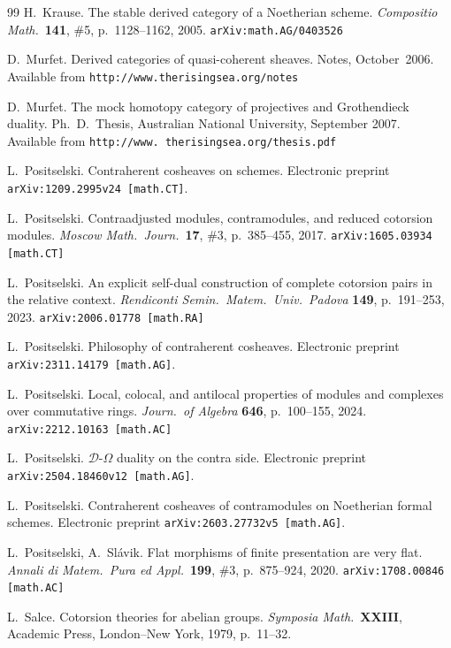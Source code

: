 \documentclass[12pt,a4paper]{amsart}
\newcommand{\+}{\nobreakdash-}
\renewcommand{\:}{\colon}
\theoremstyle{plain}
\theoremstyle{definition}
\begin{document}
\begin{thebibliography}{99}
 H.~Krause.
   The stable derived category of a Noetherian scheme.
\textit{Compositio Math.}\ \textbf{141}, \#5, p.~1128--1162, 2005.
\texttt{arXiv:math.AG/0403526}

 D.~Murfet.
   Derived categories of quasi-coherent sheaves.
Notes, October~2006.
Available from \texttt{http://www.therisingsea.org/notes}

 D.~Murfet.
   The mock homotopy category of projectives and Grothendieck duality.
Ph.~D.\ Thesis, Australian National University, September 2007.
Available from \texttt{http://www. therisingsea.org/thesis.pdf}
{\par}

 L.~Positselski.
   Contraherent cosheaves on schemes.
Electronic preprint \texttt{arXiv:1209.2995v24 [math.CT]}.

 L.~Positselski.
   Contraadjusted modules, contramodules, and reduced cotorsion modules.
\textit{Moscow Math.\ Journ.}\ \textbf{17}, \#3, p.~385--455, 2017.
\texttt{arXiv:1605.03934 [math.CT]}

 L.~Positselski.
   An explicit self-dual construction of complete cotorsion pairs
in the relative context.
\textit{Rendiconti Semin.\ Matem.\ Univ.\ Padova} \textbf{149},
p.~191--253, 2023.  \texttt{arXiv:2006.01778 [math.RA]}

 L.~Positselski.
   Philosophy of contraherent cosheaves.
Electronic preprint \texttt{arXiv:2311.14179 [math.AG]}.

 L.~Positselski.
   Local, colocal, and antilocal properties of modules and complexes
over commutative rings.
\textit{Journ.\ of Algebra} \textbf{646}, p.~100--155, 2024.
\texttt{arXiv:2212.10163 [math.AC]}

 L.~Positselski.
   $\mathcal D$\+$\Omega$ duality on the contra side.
Electronic preprint \texttt{arXiv:2504.18460v12 [math.AG]}.

 L.~Positselski.
   Contraherent cosheaves of contramodules on Noetherian formal schemes.
Electronic preprint \texttt{arXiv:2603.27732v5 [math.AG]}.

 L.~Positselski, A.~Sl\'avik.
   Flat morphisms of finite presentation are very flat.
\textit{Annali di Matem.\ Pura ed Appl.}\ \textbf{199}, \#3,
p.~875--924, 2020.  \texttt{arXiv:1708.00846 [math.AC]}

 L.~Salce.
   Cotorsion theories for abelian groups.
\textit{Symposia Math.}\ \textbf{XXIII},
Academic Press, London--New York, 1979, p.~11--32.


\end{thebibliography}
\end{document}
